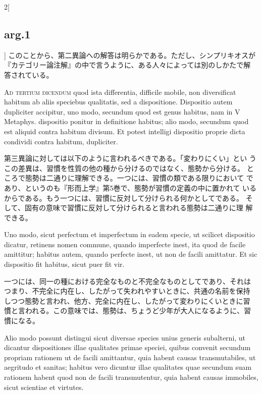 \documentclass[paper=a4paper,fontsize=10pt,jafontsize=9pt,titlepage]{jlreq}
\begin{document}
\begin{paracol}{2}[\subsection{arg.1}]
このことから、第二異論への解答は明らかである。ただし、シンプリキオスが
『カテゴリー論注解』の中で言うように、ある人々によっては別のしかたで解
答されている。

\switchcolumn*[\subsection{ad.3}]

{\scshape Ad tertium dicendum} quod ista differentia, difficile mobile, non
diversificat habitum ab aliis speciebus qualitatis, sed a
dispositione. Dispositio autem dupliciter accipitur, uno modo,
secundum quod est genus habitus, nam in V Metaphys. dispositio ponitur
in definitione habitus; alio modo, secundum quod est aliquid contra
habitum divisum. Et potest intelligi dispositio proprie dicta
condividi contra habitum, dupliciter.

\switchcolumn

第三異論に対しては以下のように言われるべきである。「変わりにくい」とい
うこの差異は、習慣を性質の他の種から分けるのではなく、態勢から分ける。
ところで態勢は二通りに理解できる。一つには、習慣の類である限りにおいて
であり、というのも『形而上学』第5巻で、態勢が習慣の定義の中に置かれて
いるからである。もう一つには、習慣に反対して分けられる何かとしてである。
そして、固有の意味で習慣に反対して分けられると言われる態勢は二通りに理
解できる。

\switchcolumn*

Uno modo, sicut perfectum et
imperfectum in eadem specie, ut scilicet dispositio dicatur, retinens
nomen commune, quando imperfecte inest, ita quod de facile amittitur;
habitus autem, quando perfecte inest, ut non de facili amittatur. Et
sic dispositio fit habitus, sicut puer fit vir.

\switchcolumn

一つには、同一の種における完全なものと不完全なものとしてであり、それは
つまり、不完全に内在し、したがって失われやすいときに、共通の名前を保持
しつつ態勢と言われ、他方、完全に内在し、したがって変わりにくいときに習
慣と言われる。この意味では、態勢は、ちょうど少年が大人になるように、習
慣になる。

\switchcolumn*

Alio modo possunt
distingui sicut diversae species unius generis subalterni, ut dicantur
dispositiones illae qualitates primae speciei, quibus convenit
secundum propriam rationem ut de facili amittantur, quia habent causas
transmutabiles, ut aegritudo et sanitas; habitus vero dicuntur illae
qualitates quae secundum suam rationem habent quod non de facili
transmutentur, quia habent causas immobiles, sicut scientiae et
virtutes.


\end{paracol}
\end{document}

